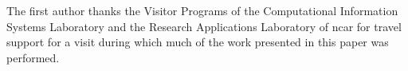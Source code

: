 




%





%
\begin{acks}
The first author thanks the Visitor Programs of the Computational Information Systems Laboratory
and the Research Applications Laboratory of \gls{ncar} for travel support for a visit during which
much of the work presented in this paper was performed.


\end{acks}
